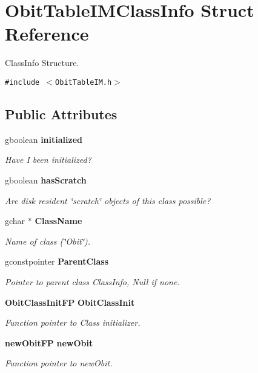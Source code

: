 \section{Obit\-Table\-IMClass\-Info Struct Reference}
\label{structObitTableIMClassInfo}
Class\-Info Structure.  


{\tt \#include $<$Obit\-Table\-IM.h$>$}

\subsection*{Public Attributes}
\begin{CompactItemize}
\item 
gboolean {\bf initialized}
\begin{CompactList}\small\item\em Have I been initialized? \item\end{CompactList}\item 
gboolean {\bf has\-Scratch}
\begin{CompactList}\small\item\em Are disk resident \char`\"{}scratch\char`\"{} objects of this class possible? \item\end{CompactList}\item 
gchar $\ast$ {\bf Class\-Name}
\begin{CompactList}\small\item\em Name of class (\char`\"{}Obit\char`\"{}). \item\end{CompactList}\item 
gconstpointer {\bf Parent\-Class}
\begin{CompactList}\small\item\em Pointer to parent class Class\-Info, Null if none. \item\end{CompactList}\item 
{\bf Obit\-Class\-Init\-FP} {\bf Obit\-Class\-Init}
\begin{CompactList}\small\item\em Function pointer to Class initializer. \item\end{CompactList}\item 
{\bf new\-Obit\-FP} {\bf new\-Obit}
\begin{CompactList}\small\item\em Function pointer to new\-Obit. \item\end{CompactList}\item 

\end{CompactItemize}
